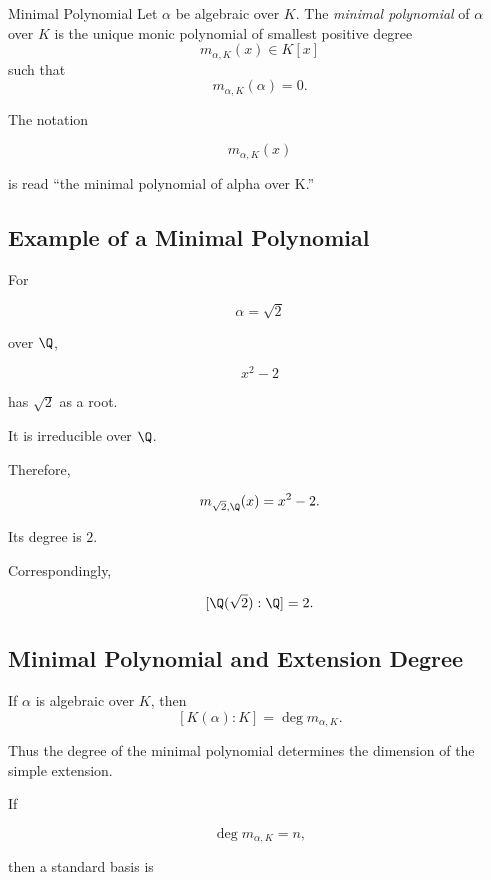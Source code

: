 \begin{definitionbox}{Minimal Polynomial}
Let \(\alpha\) be algebraic over \(K\). The \emph{minimal polynomial} of
\(\alpha\) over \(K\) is the unique monic polynomial of smallest positive
degree
\[ m_{\alpha,K}(x)\in K[x] \]
such that
\[ m_{\alpha,K}(\alpha)=0. \]
\end{definitionbox}

The notation

\[ m_{\alpha,K}(x) \]

is read ``the minimal polynomial of alpha over K.''

\subsection{Example of a Minimal Polynomial}
\label{subsec:minimal-polynomial-sqrt2}

For

\[ \alpha=\sqrt2 \]

over \(\Q\),

\[ x^2-2 \]

has \(\sqrt2\) as a root.

It is irreducible over \(\Q\).

Therefore,

\[ m_{\sqrt2,\Q}(x)=x^2-2. \]

Its degree is \(2\).

Correspondingly,

\[ [\Q(\sqrt2):\Q]=2. \]

\subsection{Minimal Polynomial and Extension Degree}
\label{subsec:minimal-polynomial-extension-degree}

\begin{theorem}
If \(\alpha\) is algebraic over \(K\), then
\[ [K(\alpha):K]=\deg m_{\alpha,K}. \]
\end{theorem}

Thus the degree of the minimal polynomial determines the dimension of the
simple extension.

If

\[ \deg m_{\alpha,K}=n, \]

then a standard basis is


